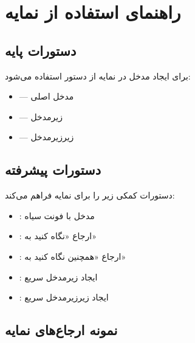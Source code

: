 \documentclass{matinbook}
\begin{document}
\chapter{راهنمای استفاده از نمایه}
\label{chap:index-commands}

\section{دستورات پایه}
\label{sec:index-basic}

برای ایجاد مدخل در نمایه از دستور
 استفاده می‌شود:

\begin{itemize}
    \item {} —
    مدخل اصلی
    \item {} —
    زیرمدخل
    \item {} —
    زیرزیرمدخل
\end{itemize}

\section{دستورات پیشرفته}
\label{sec:index-advanced}

 دستورات کمکی زیر را برای نمایه
فراهم می‌کند:

\begin{itemize}
    \item {}: مدخل با
    فونت سیاه
    \item {}: ارجاع «نگاه
    کنید به»
    \item {}: ارجاع
    «همچنین نگاه کنید به»
    \item {}: ایجاد زیرمدخل
    سریع
    \item {}: ایجاد
    زیرزیرمدخل سریع
\end{itemize}

\section{نمونه ارجاع‌های نمایه}
\label{sec:index-examples}
\end{document}
